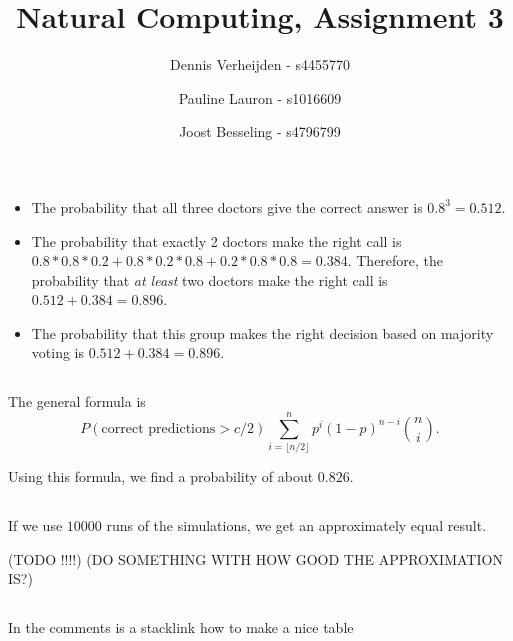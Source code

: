 \documentclass[11pt]{article}
\title{Natural Computing, Assignment 3}
\author{Dennis Verheijden - s4455770 \and Pauline Lauron - s1016609 \and Joost Besseling - s4796799}
\newcommand{\floor}[1]{\lfloor #1 \rfloor}
\begin{document}
\maketitle

\section{}
\subsection{}
\begin{itemize}
	\item 
	The probability that all three doctors give the correct answer is $ 0.8^3 = 0.512$. 
	\item 
	The probability that exactly 2 doctors make the right call is $0.8*0.8*0.2 + 0.8*0.2*0.8 + 0.2*0.8*0.8 = 0.384$. Therefore, the probability that \emph{at least} two doctors make the right call is $0.512 + 0.384 = 0.896$.
	\item  The probability that this group makes the right decision based on majority voting is $0.512 + 0.384 = 0.896$. 
\end{itemize}


\subsection{}
The general formula is 
\[
	P(\text{correct predictions} > c/2) \sum_{i = \floor{n/2}}^{n} p^{i}  (1-p)^{n-i}  \binom{n}{i}.
\]

Using this formula, we find a probability of about $0.826$.

\subsection{}
If we use $10000$ runs of the simulations, we get an approximately equal result.

(TODO !!!!)
(DO SOMETHING WITH HOW GOOD THE APPROXIMATION IS?)

\subsection{}
In the comments is a stacklink how to make a nice table

\end{document}
